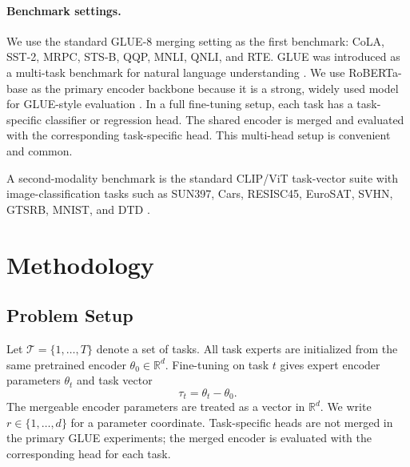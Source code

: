\documentclass[11pt]{article}
\newcommand{\thetab}{\theta_0}
\newcommand{\taskvec}{\tau}
\newcommand{\tasks}{\mathcal{T}}
\newcommand{\R}{\mathbb{R}}
\begin{document}
\paragraph{Benchmark settings.}
We use the standard GLUE-8 merging setting as the first benchmark: CoLA, SST-2, MRPC, STS-B, QQP, MNLI, QNLI, and RTE. GLUE was introduced as a multi-task benchmark for natural language understanding \citep{wang2018glue}. We use RoBERTa-base as the primary encoder backbone because it is a strong, widely used model for GLUE-style evaluation \citep{liu2019roberta}. In a full fine-tuning setup, each task has a task-specific classifier or regression head. The shared encoder is merged and evaluated with the corresponding task-specific head. This multi-head setup is convenient and common. %

A second-modality benchmark is the standard CLIP/ViT task-vector suite with image-classification tasks such as SUN397, Cars, RESISC45, EuroSAT, SVHN, GTSRB, MNIST, and DTD \citep{radford2021clip,ilharco2022taskarithmetic,tang2024fusionbench}.

\section{Methodology}

\subsection{Problem Setup}
Let $\tasks = \{1,\ldots,T\}$ denote a set of tasks. All task experts are initialized from the same pretrained encoder $\thetab \in \R^d$. Fine-tuning on task $t$ gives expert encoder parameters $\theta_t$ and task vector
\begin{equation}
    \taskvec_t = \theta_t - \thetab.
    \label{eq:task-vector}
\end{equation}
The mergeable encoder parameters are treated as a vector in $\R^d$. We write $r \in \{1,\ldots,d\}$ for a parameter coordinate. Task-specific heads are not merged in the primary GLUE experiments; the merged encoder is evaluated with the corresponding head for each task.
\end{document}
